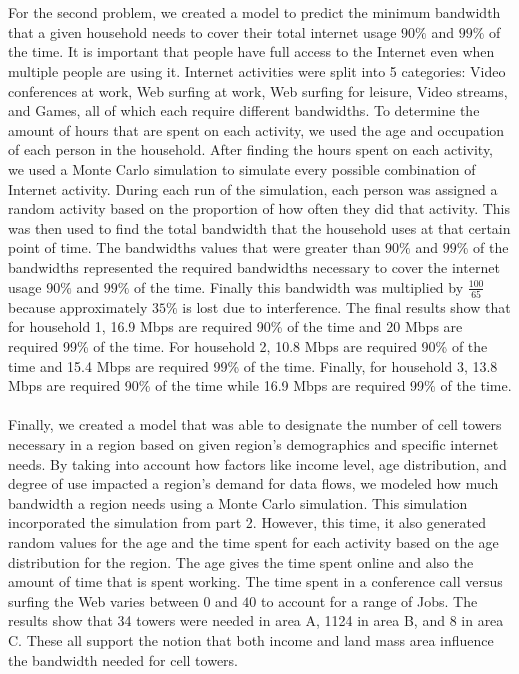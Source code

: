 \documentclass[12pt]{article}
\begin{document}
\\
\\
For the second problem, we created a model to predict the minimum bandwidth that a given household needs to cover their total internet usage $90\%$ and $99\%$ of the time. It is important that people have full access to the Internet even when multiple people are using it. Internet activities were split into 5 categories: Video conferences at work, Web surfing at work, Web surfing for leisure, Video streams, and Games, all of which each require different bandwidths. To determine the amount of hours that are spent on each activity, we used the age and occupation of each person in the household. After finding the hours spent on each activity, we used a Monte Carlo simulation to simulate every possible combination of Internet activity. During each run of the simulation, each person was assigned a random activity based on the proportion of how often they did that activity. This was then used to find the total bandwidth that the household uses at that certain point of time. The bandwidths values that were greater than $90\%$ and $99\%$ of the bandwidths represented the required bandwidths necessary to cover the internet usage $90\%$ and $99\%$ of the time. Finally this bandwidth was multiplied by $\frac{100}{65}$ because approximately $35\%$ is lost due to interference. The final results show that for household 1, 16.9 Mbps are required 90\% of the time and 20 Mbps are required 99\% of the time. For household 2, 10.8 Mbps are required 90\% of the time and 15.4 Mbps are required 99\% of the time. Finally, for household 3, 13.8 Mbps are required 90\% of the time while 16.9 Mbps are required 99\% of the time.
\\
\\
Finally, we created a model that was able to designate the number of cell towers necessary in a region based on given region's demographics and specific internet needs. By taking into account how factors like income level, age distribution, and degree of use impacted a region's demand for data flows, we modeled how much bandwidth a region needs using a Monte Carlo simulation. This simulation incorporated the simulation from part 2. However, this time, it also generated random values for the age and the time spent for each activity based on the age distribution for the region. The age gives the time spent online and also the amount of time that is spent working. The time spent in a conference call versus surfing the Web varies between $0$ and $40$ to account for a range of Jobs. The results show that 34 towers were needed in area A, 1124 in area B, and 8 in area C. These all support the notion that both income and land mass area influence the bandwidth needed for cell towers.
\end{document}
